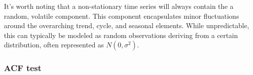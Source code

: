 \documentclass[10pt]{article}
\begin{document}




It's worth noting that a non-stationary time series will always contain the a random, volatile component. This component encapsulates minor fluctuations around the overarching trend, cycle, and seasonal elements. While unpredictable, this can typically be modeled as random observations deriving from a certain distribution, often represented as \(N(0,\sigma^2)\).
\subsubsection{ACF test}
\end{document}
